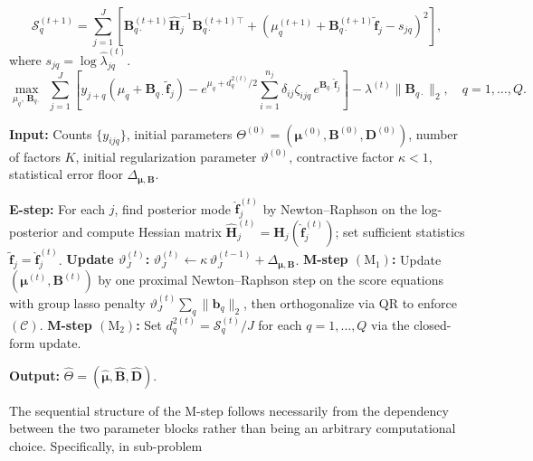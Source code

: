 \documentclass[]{report}
\theoremstyle{definition}
\begin{document}
\begin{equation}
    \mathcal{S}_q^{(t+1)} = \sum_{j=1}^J \left[\mathbf{B}_{q\cdot}^{(t+1)} \hat{\mathbf{H}}_j^{-1} \mathbf{B}_{q\cdot}^{(t+1)\top}+ \left(\mu_q^{(t+1)} + \mathbf{B}_{q\cdot}^{(t+1)}\tilde{\mathbf{f}}_j- s_{jq}\right)^2\right],
\end{equation}
where $s_{jq}=\log \hat{\lambda}_{jq}^{(t)}$.
\begin{equation}
    \max_{\mu_q,\, \mathbf{B}_{q\cdot}} \;\sum_{j=1}^J \left[y_{j+q}\!\left(\mu_q + \mathbf{B}_{q\cdot}\tilde{\mathbf{f}}_j\right)- e^{\mu_q + d_q^{2(t)}/2}\sum_{i=1}^{n_j} \delta_{ij}\zeta_{ijq}\,e^{\mathbf{B}_{q\cdot}\tilde{\mathbf{f}}_j}\right]- \lambda^{(t)} \|\mathbf{B}_{q\cdot}\|_2,\quad q = 1, \ldots, Q.
\end{equation}

  \begin{algorithm}[H]
\caption{Penalized EM Algorithm for the Factor-Structured Multinomial Model}
\label{alg:em_simple}
\textbf{Input:} Counts $\{y_{ijq}\}$, initial parameters $\Theta^{(0)} = (\boldsymbol{\mu}^{(0)}, \mathbf{B}^{(0)}, \mathbf{D}^{(0)})$, number of factors $K$, initial regularization parameter $\vartheta^{(0)}$, contractive factor $\kappa < 1$, statistical error floor $\Delta_{\bm{\mu},\mathbf{B}}$.
\begin{algorithmic}[1]
    \State \textbf{E-step:} For each $j$, find posterior mode $\hat{\mathbf{f}}_j^{(t)}$ by Newton--Raphson on the log-posterior and compute Hessian matrix $\hat{\mathbf{H}}_j^{(t)} = \mathbf{H}_j(\hat{\mathbf{f}}_j^{(t)})$; set sufficient statistics  $\tilde{\mathbf{f}}_j = \hat{\mathbf{f}}_j^{(t)}$.
    \State \textbf{Update $\vartheta_{J}^{(t)}$:}
    $\vartheta_{J}^{(t)} \leftarrow \kappa\,\vartheta_{J}^{(t-1)} +\Delta_{\bm{\mu},\mathbf{B}}$.
    \State \textbf{M-step $(\mathrm{M}_1)$:} Update $(\boldsymbol{\mu}^{(t)}, \mathbf{B}^{(t)})$ by one proximal Newton--Raphson step on the score equations with group lasso penalty $\vartheta_{J}^{(t)}\sum_q\|\mathbf{b}_q\|_2$, then orthogonalize via QR to enforce $(\mathcal{C})$.
    \State \textbf{M-step $(\mathrm{M}_2)$:} Set $d_q^{2(t)} = \mathcal{S}_q^{(t)} / J$ for each $q = 1,\ldots,Q$ via the closed-form update.
\EndFor
\end{algorithmic}
\textbf{Output:} $\hat{\Theta} = (\hat{\boldsymbol{\mu}}, \hat{\mathbf{B}}, \hat{\mathbf{D}})$.
\end{algorithm}

The sequential structure of the M-step follows necessarily from the dependency between the two parameter blocks rather than being an arbitrary computational choice. Specifically, in sub-problem 
\end{document}
